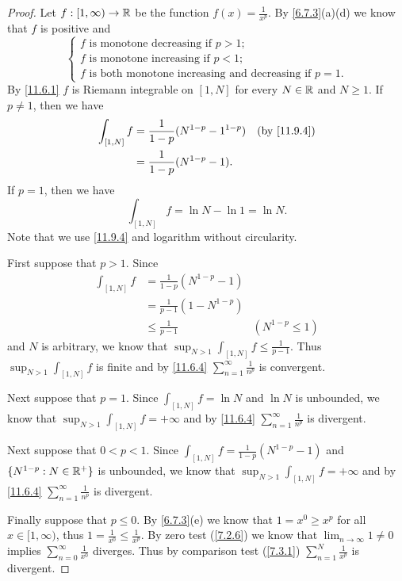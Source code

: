 \begin{proof}
  Let \(f : [1, \infty) \to \mathbb{R}\) be the function \(f(x) = \frac{1}{x^p}\).
  By \cref{6.7.3}(a)(d) we know that \(f\) is positive and
  \[
    \begin{cases}
      f \text{ is monotone decreasing if } p > 1; \\
      f \text{ is monotone increasing if } p < 1; \\
      f \text{ is both monotone increasing and decreasing if } p = 1.
    \end{cases}
  \]
  By \cref{11.6.1} \(f\) is Riemann integrable on \([1, N]\) for every \(N \in \mathbb{R}\) and \(N \geq 1\).
  If \(p \neq 1\), then we have
  \begin{align*}
    \int_{[1, N]} f & = \frac{1}{1 - p} (N^{1 - p} - 1^{1 - p}) & \text{(by \cref{11.9.4})} \\
                    & = \frac{1}{1 - p} (N^{1 - p} - 1).
  \end{align*}
  If \(p = 1\), then we have
  \[
    \int_{[1, N]} f = \ln N - \ln 1 = \ln N.
  \]
  Note that we use \cref{11.9.4} and logarithm without circularity.

  First suppose that \(p > 1\).
  Since
  \begin{align*}
    \int_{[1, N]} f & = \frac{1}{1 - p} (N^{1 - p} - 1)                      \\
                    & = \frac{1}{p - 1} (1 - N^{1 - p})                      \\
                    & \leq \frac{1}{p - 1}              & (N^{1 - p} \leq 1)
  \end{align*}
  and \(N\) is arbitrary, we know that \(\sup_{N > 1} \int_{[1, N]} f \leq \frac{1}{p - 1}\).
  Thus \(\sup_{N > 1} \int_{[1, N]} f\) is finite and by \cref{11.6.4} \(\sum_{n = 1}^\infty \frac{1}{n^p}\) is convergent.

  Next suppose that \(p = 1\).
  Since \(\int_{[1, N]} f = \ln N\) and \(\ln N\) is unbounded, we know that \(\sup_{N > 1} \int_{[1, N]} f = +\infty\) and by \cref{11.6.4} \(\sum_{n = 1}^\infty \frac{1}{n^p}\) is divergent.

  Next suppose that \(0 < p < 1\).
  Since \(\int_{[1, N]} f = \frac{1}{1 - p} (N^{1 - p} - 1)\) and \(\{N^{1 - p} : N \in \mathbb{R}^+\}\) is unbounded, we know that \(\sup_{N > 1} \int_{[1, N]} f = +\infty\) and by \cref{11.6.4} \(\sum_{n = 1}^\infty \frac{1}{n^p}\) is divergent.

  Finally suppose that \(p \leq 0\).
  By \cref{6.7.3}(e) we know that \(1 = x^0 \geq x^p\) for all \(x \in [1, \infty)\), thus \(1 = \frac{1}{x^0} \leq \frac{1}{x^p}\).
  By zero test (\cref{7.2.6}) we know that \(\lim_{n \to \infty} 1 \neq 0\) implies \(\sum_{n = 0}^\infty \frac{1}{x^0}\) diverges.
  Thus by comparison test (\cref{7.3.1}) \(\sum_{n = 1}^N \frac{1}{x^p}\) is divergent.
\end{proof}

